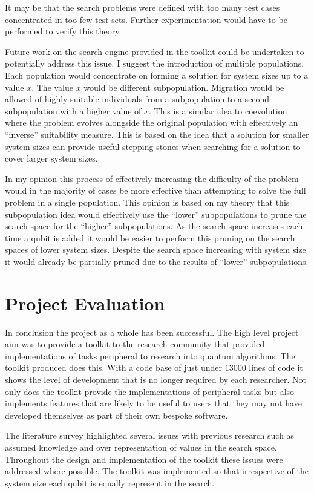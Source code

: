 It may be that the search problems were defined with too many test cases concentrated in too few test sets.
Further experimentation would have to be performed to verify this theory.

Future work on the search engine provided in the toolkit could be undertaken to potentially address this issue.
I suggest the introduction of multiple populations.
Each population would concentrate on forming a solution for system sizes up to a value $x$.
The value $x$ would be different subpopulation.
Migration would be allowed of highly suitable individuals from a subpopulation to a second subpopulation with a higher value of $x$.
This is a similar idea to coevolution where the problem evolves alongside the original population with effectively an ``inverse'' suitability measure.
This is based on the idea that a solution for smaller system sizes can provide useful stepping stones when searching for a solution to cover larger system sizes.

In my opinion this process of effectively increasing the difficulty of the problem would in the majority of cases be more effective than attempting to solve the full problem in a single population.
This opinion is based on my theory that this subpopulation idea would effectively use the ``lower'' subpopulations to prune the search space for the ``higher'' subpopulations.
As the search space increases each time a qubit is added it would be easier to perform this pruning on the search spaces of lower system sizes.
Despite the search space increasing with system size it would already be partially pruned due to the results of ``lower'' subpopulations.

\section{Project Evaluation}

In conclusion the project as a whole has been successful.
The high level project aim was to provide a toolkit to the research community that provided implementations of tasks peripheral to research into quantum algorithms.
The toolkit produced does this.
With a code base of just under $13000$ lines of code it shows the level of development that is no longer required by each researcher.
Not only does the toolkit provide the implementations of peripheral tasks but also implements features that are likely to be useful to users that they may not have developed themselves as part of their own bespoke software.

The literature survey highlighted several issues with previous research such as assumed knowledge and over representation of values in the search space.
Throughout the design and implementation of the toolkit these issues were addressed where possible.
The toolkit was implemented so that irrespective of the system size each qubit is equally represent in the search.

